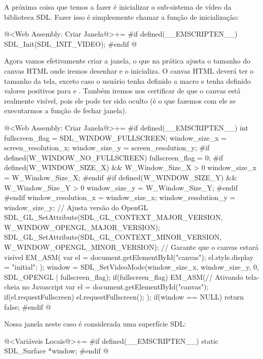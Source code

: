 A próxima coisa que temos a fazer é inicializar o sub-sistema de vídeo
da biblioteca SDL. Fazer isso é simplesmente chamar a função de
inicialização:

\iniciocodigo
@<Web Assembly: Criar Janela@>+=
#if defined(__EMSCRIPTEN__)
SDL_Init(SDL_INIT_VIDEO);
#endif
@
\fimcodigo

Agora vamos efetivamente criar a janela, o que na prática ajusta o
tamanho do canvas HTML onde iremos desenhar e o inicializa. O canvas
HTML deverá ter o tamanho da tela, exceto caso o usuário tenha
definido a macro  e tenha
definido valores positivos para 
e . Também iremos nos certificar
de que o canvas está realmente visível, pois ele pode ter sido oculto
(é o que fazemos com ele se executarmos a função de fechar janela).

\iniciocodigo
@<Web Assembly: Criar Janela@>+=
#if defined(__EMSCRIPTEN__)
{
  int fullscreen_flag = SDL_WINDOW_FULLSCREEN;
  window_size_x = screen_resolution_x;
  window_size_y = screen_resolution_y;
#if defined(W_WINDOW_NO_FULLSCREEN)
  fullscreen_flag = 0;
#if defined(W_WINDOW_SIZE_X) && W_Window_Size_X > 0
  window_size_x = W_Window_Size_X;
#endif
#if defined(W_WINDOW_SIZE_Y) && W_Window_Size_Y > 0
  window_size_y = W_Window_Size_Y;
#endif
#endif
  window_resolution_x = window_size_x;
  window_resolution_y = window_size_y;
  // Ajusta versão do OpenGL
  SDL_GL_SetAttribute(SDL_GL_CONTEXT_MAJOR_VERSION,
                     W_WINDOW_OPENGL_MAJOR_VERSION);
  SDL_GL_SetAttribute(SDL_GL_CONTEXT_MINOR_VERSION,
                     W_WINDOW_OPENGL_MINOR_VERSION);
  // Garante que o canvas estará visível
  EM_ASM(
    var el = document.getElementById("canvas");
    el.style.display = "initial";
  );
  window = SDL_SetVideoMode(window_size_x, window_size_y, 0,
                            SDL_OPENGL | fullscreen_flag);
  if(fullscreen_flag){
    EM_ASM(// Ativando tela-cheia no Javascript
      var el = document.getElementById("canvas");
      if(el.requestFullscreen){
        el.requestFullscreen();
      }
    );
  }
  if(window == NULL)
    return false;
}
#endif
@
\fimcodigo

Nossa janela neste caso é considerada uma superfície SDL:

\iniciocodigo
@<Variáveis Locais@>+=
#if defined(__EMSCRIPTEN__)
static SDL_Surface *window;
#endif
@
\fimcodigo


